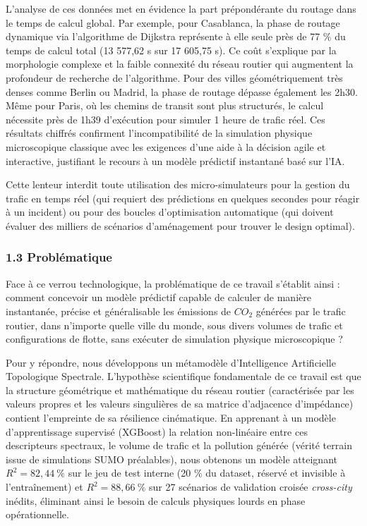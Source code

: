 \documentclass[10pt, a4paper]{article}
\begin{document}
L'analyse de ces données met en évidence la part prépondérante du
routage dans le temps de calcul global. Par exemple, pour Casablanca, la
phase de routage dynamique via l'algorithme de Dijkstra représente à
elle seule près de 77 \% du temps de calcul total (13 577,62 s sur 17
605,75 s). Ce coût s'explique par la morphologie complexe et la faible
connexité du réseau routier qui augmentent la profondeur de recherche de
l'algorithme. Pour des villes géométriquement très denses comme Berlin
ou Madrid, la phase de routage dépasse également les 2h30. Même pour
Paris, où les chemins de transit sont plus structurés, le calcul
nécessite près de 1h39 d'exécution pour simuler 1 heure de trafic réel.
Ces résultats chiffrés confirment l'incompatibilité de la simulation
physique microscopique classique avec les exigences d'une aide à la
décision agile et interactive, justifiant le recours à un modèle
prédictif instantané basé sur l'IA.

Cette lenteur interdit toute utilisation des micro-simulateurs pour la
gestion du trafic en temps réel (qui requiert des prédictions en
quelques secondes pour réagir à un incident) ou pour des boucles
d'optimisation automatique (qui doivent évaluer des milliers de
scénarios d'aménagement pour trouver le design optimal).

\subsubsection{1.3 Problématique}\label{probluxe9matique}

Face à ce verrou technologique, la problématique de ce travail s'établit
ainsi : comment concevoir un modèle prédictif capable de calculer de
manière instantanée, précise et généralisable les émissions de \(CO_2\)
générées par le trafic routier, dans n'importe quelle ville du monde,
sous divers volumes de trafic et configurations de flotte, sans exécuter
de simulation physique microscopique ?

Pour y répondre, nous développons un métamodèle d'Intelligence
Artificielle Topologique Spectrale. L'hypothèse scientifique
fondamentale de ce travail est que la structure géométrique et
mathématique du réseau routier (caractérisée par les valeurs propres et
les valeurs singulières de sa matrice d'adjacence d'impédance) contient
l'empreinte de sa résilience cinématique. En apprenant à un modèle
d'apprentissage supervisé (XGBoost) la relation non-linéaire entre ces
descripteurs spectraux, le volume de trafic et la pollution générée
(vérité terrain issue de simulations SUMO préalables), nous obtenons un
modèle atteignant \(R^2 = 82{,}44\ \%\) sur le jeu de test interne (20
\% du dataset, réservé et invisible à l'entraînement) et
\(R^2 = 88{,}66\ \%\) sur 27 scénarios de validation croisée
\emph{cross-city} inédits, éliminant ainsi le besoin de calculs
physiques lourds en phase opérationnelle.
\end{document}
